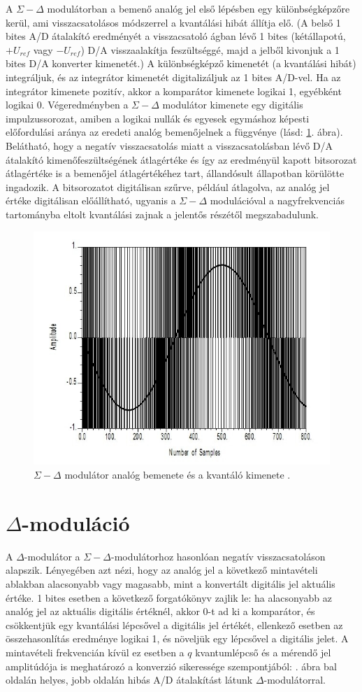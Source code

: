 \documentclass[12pt]{article}
\theoremstyle{plain}
\begin{document}
A $\Sigma-\Delta$ modulátorban a bemenő analóg jel első lépésben egy különbségképzőre kerül, ami visszacsatolásos módszerrel a kvantálási hibát állítja elő. (A belső 1 bites A/D átalakító eredményét a visszacsatoló ágban lévő 1 bites (kétállapotú, $+U_{ref}$ vagy $ - U_{ref}$) D/A visszaalakítja
feszültséggé, majd a jelből kivonjuk a  1 bites D/A konverter kimenetét.) A különbségképző kimenetét (a kvantálási hibát) integráljuk, és az integrátor kimenetét digitalizáljuk az 1 bites A/D-vel. Ha az integrátor kimenete pozitív, akkor a komparátor kimenete logikai 1, egyébként logikai 0. Végeredményben a $\Sigma-\Delta$ modulátor kimenete egy digitális impulzussorozat, amiben a logikai nullák és egyesek egymáshoz képesti előfordulási aránya az eredeti analóg
bemenőjelnek a függvénye (lásd: \ref{fig:sigmadeltamodulator}. ábra).
Belátható, hogy a negatív visszacsatolás miatt a visszacsatolásban lévő D/A átalakító kimenőfeszültségének átlagértéke és így az eredményül kapott bitsorozat
átlagértéke is a bemenőjel átlagértékéhez tart, állandósult állapotban körülötte ingadozik. A bitsorozatot digitálisan szűrve, például átlagolva, az analóg jel értéke digitálisan előállítható, ugyanis a $\Sigma-\Delta$ modulációval a nagyfrekvenciás tartományba eltolt kvantálási zajnak a jelentős részétől megszabadulunk.


\begin{figure}
	\centering
	\includegraphics[width=0.5\linewidth]{media/sigma_delta_modulator}
	\caption{$\Sigma-\Delta$ modulátor analóg bemenete és a kvantáló kimenete \cite{quora}.}
	\label{fig:sigmadeltamodulator}
\end{figure}


\section{$\Delta$-moduláció \cite{quora}}

A $\Delta$-modulátor a $\Sigma-\Delta$-modulátorhoz hasonlóan negatív visszacsatoláson alapszik. Lényegében azt nézi, hogy az analóg jel a következő mintavételi ablakban alacsonyabb vagy magasabb, mint a konvertált digitális jel aktuális értéke. 1 bites esetben a következő forgatókönyv zajlik le: ha alacsonyabb az analóg jel az aktuális digitális értéknél, akkor 0-t ad ki a komparátor, és csökkentjük egy kvantálási lépcsővel a digitális jel értékét, ellenkező esetben az összehasonlítás eredménye logikai 1, és növeljük egy lépcsővel a digitális jelet. A mintavételi frekvencián kívül ez esetben a $q$ kvantumlépcső és a mérendő jel amplitúdója is meghatározó a konverzió sikeressége szempontjából: . ábra bal oldalán helyes, jobb oldalán hibás A/D átalakítást látunk $\Delta$-modulátorral. 
\end{document}

